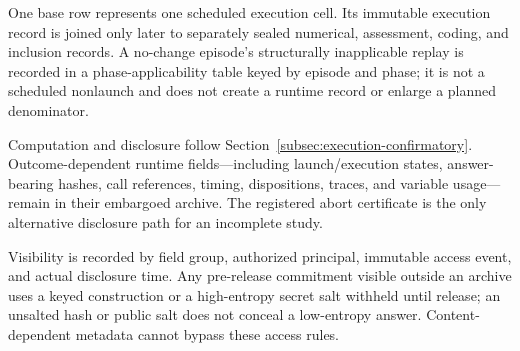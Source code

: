 \documentclass[10pt]{article} %
\providecommand{\1}{\mathbf{1}}  %
\theoremstyle{remark}
\theoremstyle{definition}
\begin{document}
One base row represents one scheduled execution cell. Its immutable
execution record is joined only later to separately sealed numerical,
assessment, coding, and inclusion records. A no-change episode's
structurally inapplicable replay is recorded in a phase-applicability
table keyed by episode and phase; it is not a scheduled nonlaunch and
does not create a runtime record or enlarge a planned denominator.

Computation and disclosure follow Section~\ref{subsec:execution-confirmatory}.
Outcome-dependent runtime fields---including launch/execution states,
answer-bearing hashes, call references, timing, dispositions, traces, and
variable usage---remain in their embargoed archive. The registered abort
certificate is the only alternative disclosure path for an incomplete study.

Visibility is recorded by field group, authorized principal, immutable
access event, and actual disclosure time. Any pre-release commitment visible
outside an archive uses a keyed construction or a high-entropy secret salt withheld until
release; an unsalted hash or public salt does not conceal a low-entropy
answer. Content-dependent metadata cannot bypass these access rules.
\end{document}
